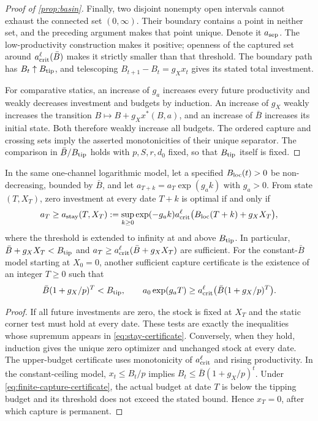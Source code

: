 \begin{proof}[Proof of \cref{prop:basin}]
Finally, two disjoint nonempty open intervals cannot exhaust the
connected set $(0,\infty)$. Their boundary contains a point in neither
set, and the preceding argument makes that point unique. Denote it
$a_{\rm sep}$. The low-productivity construction makes it positive;
openness of the captured set around $a_{\rm crit}^{\ell}(\bar B)$
makes it strictly smaller than that threshold. The boundary path has
$B_t\uparrow B_{\rm tip}$, and telescoping
$B_{t+1}-B_t=g_Xx_t$ gives its stated total investment.

For comparative statics, an increase of $g_a$ increases every future
productivity and weakly decreases investment and budgets by induction.
An increase of $g_X$ weakly increases the transition
$B\mapsto B+g_Xx^*(B,a)$, and an increase of $\bar B$ increases its
initial state. Both therefore weakly increase all budgets. The ordered
capture and crossing sets imply the asserted monotonicities of their
unique separator. The comparison in $\bar B/B_{\rm tip}$ holds with
$p,S,r,d_0$ fixed, so that $B_{\rm tip}$ itself is fixed.
\end{proof}

\begin{lemma}
\label{lem:stay-certificate}
In the same one-channel logarithmic model, let a specified
$B_{\rm loc}(t)>0$ be non-decreasing, bounded by $\bar B$, and let
$a_{T+k}=a_T\exp(g_ak)$ with $g_a>0$. From state $(T,X_T)$,
zero investment at every date $T+k$ is optimal if and only if
\begin{equation}
 a_T\geq a_{\rm stay}(T,X_T):=
 \sup_{k\geq0}\exp(-g_ak)
 a_{\rm crit}^{\ell}\bigl(B_{\rm loc}(T+k)+g_XX_T\bigr),
 \label{eq:stay-certificate}
\end{equation}
where the threshold is extended to infinity at and above
$B_{\rm tip}$. In particular,
$\bar B+g_XX_T<B_{\rm tip}$ and
$a_T\geq a_{\rm crit}^{\ell}(\bar B+g_XX_T)$ are sufficient.
For the constant-$\bar B$ model starting at $X_0=0$, another sufficient
capture certificate is the existence of an integer $T\geq0$ such that
\begin{equation}
 \bar B(1+g_X/p)^T<B_{\rm tip},\qquad
 a_0\exp(g_aT)\geq
 a_{\rm crit}^{\ell}\bigl(\bar B(1+g_X/p)^T\bigr).
 \label{eq:finite-capture-certificate}
\end{equation}
\end{lemma}
\begin{proof}
If all future investments are zero, the stock is fixed at $X_T$ and
the static corner test must hold at every date. These tests are exactly
the inequalities whose supremum appears in \cref{eq:stay-certificate}.
Conversely, when they hold, induction gives the unique zero optimizer
and unchanged stock at every date. The upper-budget certificate uses
monotonicity of $a_{\rm crit}^{\ell}$ and rising productivity.
In the constant-ceiling model, $x_t\leq B_t/p$ implies
$B_t\leq\bar B(1+g_X/p)^t$. Under
\cref{eq:finite-capture-certificate}, the actual budget at date $T$
is below the tipping budget and its threshold does not exceed the
stated bound. Hence $x_T=0$, after which capture is permanent.
\end{proof}

